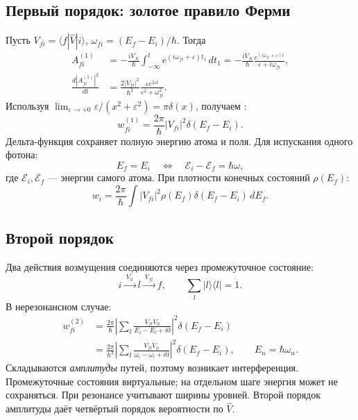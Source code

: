 \documentclass[../final.tex]{subfiles}
\begin{document}
\subsection{Первый порядок: золотое правило Ферми}

Пусть \(V_{fi}=\langle f|\hat V|i\rangle\),
\(\omega_{fi}=(E_f-E_i)/\hbar\). Тогда
\begin{align*}
    A_{fi}^{(1)}
       &=-\frac{iV_{fi}}{\hbar}
         \int_{-\infty}^{t}e^{(i\omega_{fi}+\varepsilon)t_1}\,dt_1
        =-\frac{iV_{fi}}{\hbar}
          \frac{e^{(i\omega_{fi}+\varepsilon)t}}{\varepsilon+i\omega_{fi}},\\
    \frac{d|A_{fi}^{(1)}|^2}{dt}
       &=\frac{2|V_{fi}|^2}{\hbar^2}
          \frac{\varepsilon e^{2\varepsilon t}}
               {\varepsilon^2+\omega_{fi}^2}.
\end{align*}
Используя \(\lim_{\varepsilon\to+0}\varepsilon/(x^2+\varepsilon^2)
=\pi\delta(x)\), получаем :
\begin{equation*}
    w_{fi}^{(1)}=\frac{2\pi}{\hbar}|V_{fi}|^2\delta(E_f-E_i).
\end{equation*}
Дельта-функция сохраняет полную энергию атома и поля.
Для испускания одного фотона:
\begin{equation*}
    E_f=E_i\quad\Longleftrightarrow\quad
    \mathcal E_i-\mathcal E_f=\hbar\omega,
\end{equation*}
где \(\mathcal E_i,\mathcal E_f\) --- энергии самого атома.
При плотности конечных состояний \(\rho(E_f)\):
\begin{equation*}
    w_i=\frac{2\pi}{\hbar}\int
    |V_{fi}|^2\rho(E_f)\delta(E_f-E_i)\,dE_f.
\end{equation*}

\subsection{Второй порядок}

Два действия возмущения соединяются через промежуточное состояние:
\begin{equation*}
    i\xrightarrow{\ V_{li}\ }l\xrightarrow{\ V_{fl}\ }f,\qquad
    \sum_l|l\rangle\langle l|=1.
\end{equation*}
В нерезонансном случае:
\begin{align*}
    w_{fi}^{(2)}
    &=\frac{2\pi}{\hbar}
      \left|\sum_l\frac{V_{fl}V_{li}}{E_i-E_l+i0}\right|^2
      \delta(E_f-E_i)\\
    &=\frac{2\pi}{\hbar^3}
      \left|\sum_l\frac{V_{fl}V_{li}}{\omega_i-\omega_l+i0}\right|^2
      \delta(E_f-E_i),\qquad E_n=\hbar\omega_n.
\end{align*}
Складываются \emph{амплитуды} путей, поэтому возникает интерференция.
Промежуточные состояния виртуальные; на отдельном шаге энергия
может не сохраняться. При резонансе учитывают ширины уровней.
Второй порядок амплитуды даёт четвёртый порядок вероятности по \(\hat V\).
\end{document}
